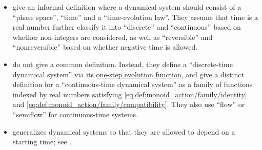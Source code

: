 \begin{remark}
\begin{itemize}
    \item {} give an informal definition where a dynamical system should consist of a \enquote{phase space}, \enquote{time} and a \enquote{time-evolution law}. They assume that time is a real number further classify it into \enquote{discrete} and \enquote{continuous} based on whether non-integers are considered, as well as \enquote{reversible} and \enquote{nonreversible} based on whether negative time is allowed.

    \item {} do not give a common definition. Instead, they define a \enquote{discrete-time dynamical system} via its \hyperref[def:one_step_evolution_function]{one-step evolution function}, and give a distinct definition for a \enquote{continuous-time dynamical system} as a family of functions indexed by real numbers satisfying \ref{eq:def:monoid_action/family/identity} and \ref{eq:def:monoid_action/family/compatibility}. They also use \enquote{flow} or \enquote{semiflow} for continuous-time systems.

    \item {} generalizes dynamical systems so that they are allowed to depend on a starting time; see .
  \end{itemize}
\end{remark}

